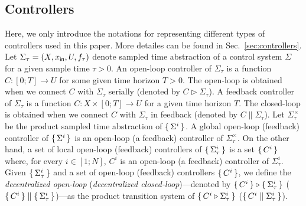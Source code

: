 \subsection{Controllers} Here, we only introduce the notations for representing different types of controllers used in this paper. More detailes can be found in Sec.~\ref{sec:controllers}. Let $\Sigma_\tau=(X,x_{\mathsf{in}},U,f_\tau)$ denote sampled time abstraction of a control system $\Sigma$ for a given sample time $\tau>0$. An open-loop controller of $\Sigma_\tau$ is a function $C\colon [0;T]\to U$ for some given time horizon $T>0$. The open-loop is obtained when we connect $C$ with $\Sigma_\tau$ serially (denoted by $C \triangleright \Sigma_\tau$). %
 A feedback controller of $\Sigma_\tau$ is a function $C\colon X\times[0;T]\to U$ for a given time horizon $T$. The closed-loop is obtained when we connect $C$ with $\Sigma_\tau$ in feedback (denoted by $C\parallel\Sigma_\tau$). %
Let $\Sigma^\times_\tau$ be the product sampled time abstraction of $\set{\Sigma^i} $.
A global open-loop (feedback) controller of $\set{\Sigma^i} $ is an open-loop (a feedback) controller of $\Sigma_\tau^\times$.
On the other hand, a set of local open-loop (feedback) controllers of $\set{\Sigma^i_\tau} $ is a set $\set{C^i} $ where, for every $i\in [1;N]$, $C^i$ is an open-loop (a feedback) controller of $\Sigma^i_\tau$. Given $\set{\Sigma_\tau^i} $ and a set of open-loop (feedback) controllers $\set{C^i} $, we define the \emph{decentralized open-loop} (\emph{decentralized closed-loop})---denoted by $\set{C^i} \triangleright \set{\Sigma_\tau^i} $ ($\set{C^i} \parallel \set{\Sigma_\tau^i} $)---as the product transition system of $\set{C^i\triangleright \Sigma^i_\tau} $ ($\set{C^i\parallel \Sigma^i_\tau} $).

